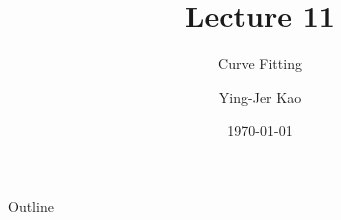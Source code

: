 \documentclass{beamer}
\title[Curve Fitting] %
{Lecture 11}
\subtitle
{Curve Fitting} %
\author[Ying-Jer Kao] %
{Ying-Jer Kao}
\institute[National Taiwan University] %
{
  Department of Physics\\
 National Taiwan University
  }
\date[Numerical Analysis and Programming] %
{\today}
\begin{document}
\begin{frame}
  \titlepage
\end{frame}

\begin{frame}{Outline}
  \tableofcontents
\end{frame}



\end{document}
